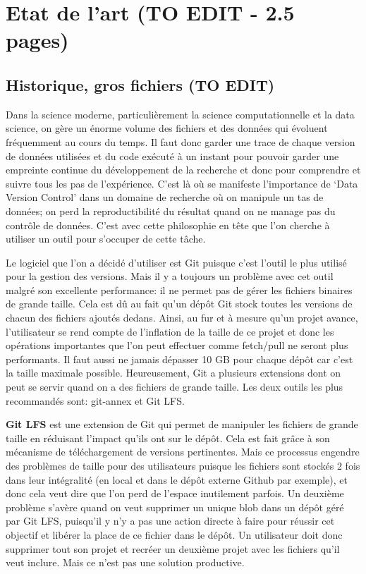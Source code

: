 \documentclass[11pt]{article}
\begin{document}
\section{Etat de l'art (TO EDIT - 2.5 pages)}
\label{sec:orgbd601c3}
\subsection{Historique, gros fichiers (TO EDIT)}
\label{sec:orgb46a2de}
Dans la science moderne, particulièrement la science computationnelle
et la data science, on gère un énorme volume des fichiers et des
données qui évoluent fréquemment au cours du temps. Il faut donc
garder une trace de chaque version de données utilisées et du code
exécuté à un instant pour pouvoir garder une empreinte continue du
développement de la recherche et donc pour comprendre et suivre tous
les pas de l'expérience. C’est là où se manifeste l’importance de
‘Data Version Control’ dans un domaine de recherche où on manipule un
tas de données; on perd la reproductibilité du résultat quand on ne
manage pas du contrôle de données. C’est avec cette philosophie en
tête que l’on cherche à utiliser un outil pour s’occuper de cette
tâche.

Le logiciel que l’on a décidé d’utiliser est Git puisque c’est
l’outil le plus utilisé pour la gestion des versions. Mais il y a
toujours un problème avec cet outil malgré son excellente performance:
il ne permet pas de gérer les fichiers binaires de grande
taille. Cela est dû au fait qu’un dépôt Git stock toutes les versions
de chacun des fichiers ajoutés dedans. Ainsi, au fur et à mesure qu’un
projet avance, l’utilisateur se rend compte de l’inflation de la
taille de ce projet et donc les opérations importantes que l’on peut
effectuer comme fetch/pull ne seront plus performants. Il faut
aussi ne jamais dépasser 10 GB pour chaque dépôt car c’est la taille
maximale possible. Heureusement, Git a plusieurs extensions dont on
peut se servir quand on a des fichiers de grande taille. Les deux
outils les plus recommandés sont: git-annex et Git LFS.

\textbf{Git LFS} est une extension de Git qui permet de manipuler les fichiers
de grande taille en réduisant l'impact qu'ils ont sur le dépôt. Cela
est fait grâce à son mécanisme de téléchargement de versions
pertinentes. Mais ce processus engendre des problèmes de taille pour des
utilisateurs puisque les fichiers sont stockés 2 fois dans
leur intégralité (en local et dans le dépôt externe Github par
exemple), et donc cela veut dire que l'on perd de l'espace inutilement
parfois.
Un deuxième problème s'avère quand on veut supprimer un
unique blob dans un dépôt géré par Git LFS, puisqu'il y n'y a pas une
action directe à faire pour réussir cet objectif et libérer la place
de ce fichier dans le dépôt. Un utilisateur doit donc supprimer tout
son projet et recréer un deuxième projet avec les fichiers qu'il veut
inclure. Mais ce n'est pas une solution productive.
\end{document}
